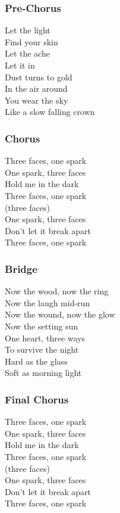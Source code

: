 \subsubsection{Pre-Chorus}\label{pre-chorus-26}

Let the light\\
Find your skin\\
Let the ache\\
Let it in\\
Dust turns to gold\\
In the air around\\
You wear the sky\\
Like a slow falling crown

\subsubsection{Chorus}\label{chorus-45}

Three faces, one spark\\
One spark, three faces\\
Hold me in the dark\\
Three faces, one spark\\
(three faces)\\
One spark, three faces\\
Don't let it break apart\\
Three faces, one spark

\subsubsection{Bridge}\label{bridge-16}

Now the wood, now the ring\\
Now the laugh mid-run\\
Now the wound, now the glow\\
Now the setting sun\\
One heart, three ways\\
To survive the night\\
Hard as the glass\\
Soft as morning light

\subsubsection{Final Chorus}\label{final-chorus-5}

Three faces, one spark\\
One spark, three faces\\
Hold me in the dark\\
Three faces, one spark\\
(three faces)\\
One spark, three faces\\
Don't let it break apart\\
Three faces, one spark

